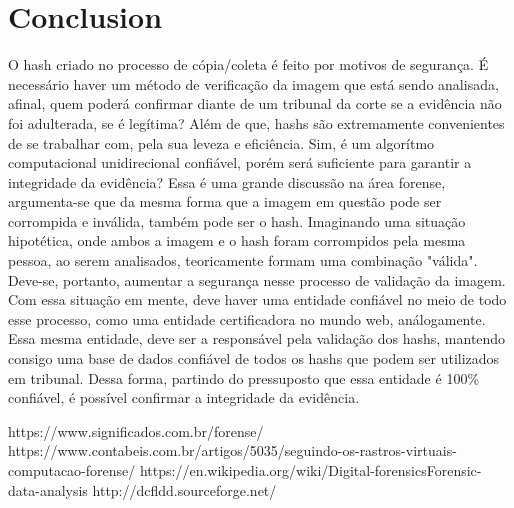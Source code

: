 \documentclass[journal]{IEEEtran}
\begin{document}
\section{Conclusion}
O hash criado no processo de cópia/coleta é feito por motivos de segurança. É necessário haver um método de verificação da imagem que está sendo analisada, afinal, quem poderá confirmar diante de um tribunal da corte se a evidência não foi adulterada, se é legítima? Além de que, hashs são extremamente convenientes de se trabalhar com, pela sua leveza e eficiência. Sim, é um algorítmo computacional unidirecional confiável, porém será suficiente para garantir a integridade da evidência? Essa é uma grande discussão na área forense, argumenta-se que da mesma forma que a imagem em questão pode ser corrompida e inválida, também pode ser o hash. Imaginando uma situação hipotética, onde ambos a imagem e o hash foram corrompidos pela mesma pessoa, ao serem analisados, teoricamente formam uma combinação "válida". Deve-se, portanto, aumentar a segurança nesse processo de validação da imagem. Com essa situação em mente, deve haver uma entidade confiável no meio de todo esse processo, como uma entidade certificadora no mundo web, análogamente. Essa mesma entidade, deve ser a responsável pela validação dos hashs, mantendo consigo uma base de dados confiável de todos os hashs que podem ser utilizados em tribunal. Dessa forma, partindo do pressuposto que essa entidade é 100\% confiável, é possível confirmar a integridade da evidência.



\begin{thebibliography}{1}

https://www.significados.com.br/forense/
https://www.contabeis.com.br/artigos/5035/seguindo-os-rastros-virtuais-computacao-forense/
https://en.wikipedia.org/wiki/Digital-forensicsForensic-data-analysis
http://dcfldd.sourceforge.net/


\end{thebibliography}
\end{document}
